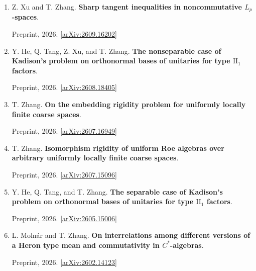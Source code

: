 \documentclass[11pt,letterpaper]{article}
\begin{document}
\begin{enumerate}[resume*=preprints]
\raggedright

\item \begin{minipage}[t]{\linewidth}\raggedright Z. Xu and T. Zhang. \textbf{Sharp tangent inequalities in noncommutative \(L_p\)-spaces}.\par Preprint, 2026. [\href{https://arxiv.org/abs/2609.16202}{arXiv:2609.16202}]\end{minipage}

\item \begin{minipage}[t]{\linewidth}\raggedright Y. He, Q. Tang, Z. Xu, and T. Zhang. \textbf{The nonseparable case of Kadison's problem on orthonormal bases of unitaries for type \(\mathrm{II}_1\) factors}.\par Preprint, 2026. [\href{https://arxiv.org/abs/2608.18405}{arXiv:2608.18405}]\end{minipage}

\item \begin{minipage}[t]{\linewidth}\raggedright T. Zhang. \textbf{On the embedding rigidity problem for uniformly locally finite coarse spaces}.\par Preprint, 2026. [\href{https://arxiv.org/abs/2607.16949}{arXiv:2607.16949}]\end{minipage}

\item \begin{minipage}[t]{\linewidth}\raggedright T. Zhang. \textbf{Isomorphism rigidity of uniform Roe algebras over arbitrary uniformly locally finite coarse spaces}.\par Preprint, 2026. [\href{https://arxiv.org/abs/2607.15096}{arXiv:2607.15096}]\end{minipage}

\item \begin{minipage}[t]{\linewidth}\raggedright Y. He, Q. Tang, and T. Zhang. \textbf{The separable case of Kadison's problem on orthonormal bases of unitaries for type \(\mathrm{II}_1\) factors}.\par Preprint, 2026. [\href{https://arxiv.org/abs/2605.15006}{arXiv:2605.15006}]\end{minipage}

\item \begin{minipage}[t]{\linewidth}\raggedright L. Molnár and T. Zhang. \textbf{On interrelations among different versions of a Heron type mean and commutativity in \(C^*\)-algebras}.\par Preprint, 2026. [\href{https://arxiv.org/abs/2602.14123}{arXiv:2602.14123}]\end{minipage}


\end{enumerate}
\end{document}
